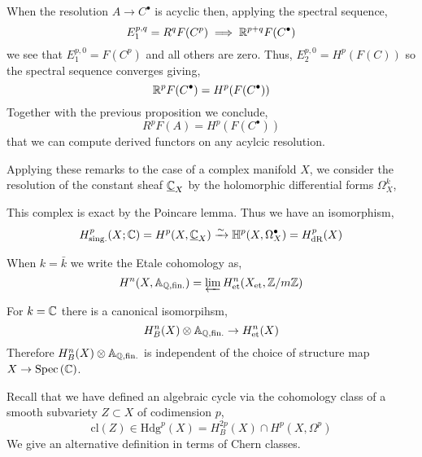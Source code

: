 \documentclass[12pt]{article}
\begin{document}
\begin{remark}
When the resolution $A \to C^\bullet$ is acyclic then, applying the spectral sequence,
\[ E_1^{p,q} = R^q F(C^p) \implies \mathbb{R}^{p + q} F(C^\bullet) \]
we see that $E_1^{p,0} = F(C^p)$ and all others are zero. Thus, $E_2^{p,0} = H^p(F(C))$ so the spectral sequence converges giving,
\[ \mathbb{R}^{p} F(C^\bullet) = H^p(F(C^\bullet)) \]
Together with the previous proposition we conclude,
\[ R^p F(A) = H^p(F(C^\bullet)) \]
that we can compute derived functors on any acylcic resolution.
\end{remark}

\begin{remark}
Applying these remarks to the case of a complex manifold $X$, we consider the resolution of the constant sheaf $\underline{\mathbb{C}}_X$ by the holomorphic differential forms $\Omega^k_X$,
\begin{center}
\end{center}
This complex is exact by the Poincare lemma. Thus we have an isomorphism,
\[ H^p_{\text{sing}.}(X; \mathbb{C}) = H^p(X, \underline{\mathbb{C}}_X) \xrightarrow{\sim} \mathbb{H}^p(X, \Omega^\bullet_X) = H^p_{\mathrm{dR}}(X) \]
\end{remark}

\newcommand{\Afin}{\mathbb{A}_{\Q, \text{fin}.}}

\begin{definition}
When $k = \bar{k}$ we write the Etale cohomology as,
\[ H^n(X, \Afin) = \varprojlim H^n_{\text{et}}(X_{\text{et}}, \Z / m \Z) \]
\end{definition}

\begin{theorem}
For $k = \mathbb{C}$ there is a canonical isomorpihsm,
\[ H^n_B(X) \otimes \Afin \to H^n_{\text{et}}(X) \]
Therefore $H^n_B(X) \otimes \Afin$ is independent of the choice of structure map $X \to \mathrm{Spec}\left( \mathbb{C} \right)$. 
\end{theorem}

\newcommand{\Hdg}{\mathrm{Hdg}}
\newcommand{\cl}[1]{\mathrm{cl} \left( #1 \right)}

\begin{remark}
Recall that we have defined an algebraic cycle via the cohomology class of a smooth subvariety $Z \subset X$ of codimension $p$,
\[ \cl{Z} \in \Hdg^p(X) = H^{2p}_B(X) \cap H^{p}(X, \Omega^p) \]
We give an alternative definition in terms of Chern classes.
\end{remark}
\end{document}

